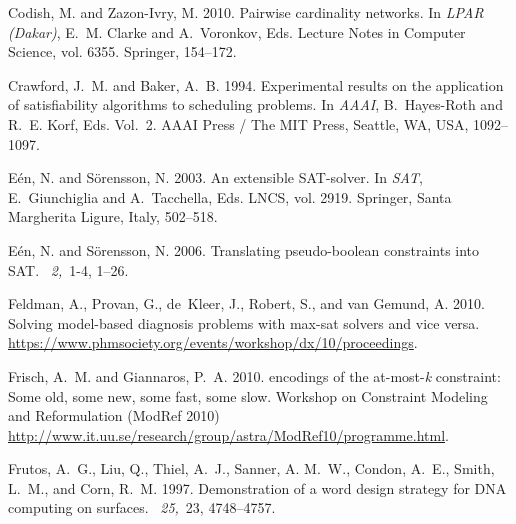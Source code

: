 \documentclass{tlp}
\begin{document}
\begin{thebibliography}{}
{\sc Codish, M.} {\sc and} {\sc Zazon-Ivry, M.} 2010.
\newblock Pairwise cardinality networks.
\newblock In {\em LPAR (Dakar)}, {E.~M. Clarke} {and} {A.~Voronkov}, Eds.
  Lecture Notes in Computer Science, vol. 6355. Springer, 154--172.

{\sc Crawford, J.~M.} {\sc and} {\sc Baker, A.~B.} 1994.
\newblock Experimental results on the application of satisfiability algorithms
  to scheduling problems.
\newblock In {\em AAAI}, {B.~Hayes-Roth} {and} {R.~E. Korf}, Eds. Vol.~2. AAAI
  Press / The MIT Press, Seattle, WA, USA, 1092--1097.

{\sc E{\'e}n, N.} {\sc and} {\sc S{\"o}rensson, N.} 2003.
\newblock An extensible {SAT}-solver.
\newblock In {\em SAT}, {E.~Giunchiglia} {and} {A.~Tacchella}, Eds. LNCS, vol.
  2919. Springer, Santa Margherita Ligure, Italy, 502--518.

{\sc E\'en, N.} {\sc and} {\sc S\"orensson, N.} 2006.
\newblock Translating pseudo-boolean constraints into {SAT}.
~{\em 2,\/}~1-4, 1--26.

{\sc Feldman, A.}, {\sc Provan, G.}, {\sc de~Kleer, J.}, {\sc Robert, S.}, {\sc
  and} {\sc van Gemund, A.} 2010.
\newblock Solving model-based diagnosis problems with max-sat solvers and vice
  versa.
\newblock \url{https://www.phmsociety.org/events/workshop/dx/10/proceedings}.

{\sc Frisch, A.~M.} {\sc and} {\sc Giannaros, P.~A.} 2010.
 encodings of the at-most-\textit{k} constraint: Some old, some
  new, some fast, some slow.
\newblock Workshop on Constraint Modeling and Reformulation (ModRef 2010)
  \url{http://www.it.uu.se/research/group/astra/ModRef10/programme.html}.

{\sc Frutos, A.~G.}, {\sc Liu, Q.}, {\sc Thiel, A.~J.}, {\sc Sanner, A. M.~W.},
  {\sc Condon, A.~E.}, {\sc Smith, L.~M.}, {\sc and} {\sc Corn, R.~M.} 1997.
\newblock Demonstration of a word design strategy for {DNA} computing on
  surfaces.
~{\em 25,\/}~23, 4748--4757.


\end{thebibliography}
\end{document}
